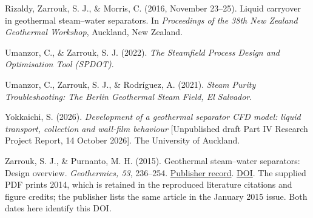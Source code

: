 Rizaldy, Zarrouk, S. J., \& Morris, C. (2016, November 23--25). Liquid carryover in geothermal steam--water separators. In \emph{Proceedings of the 38th New Zealand Geothermal Workshop}, Auckland, New Zealand.

Umanzor, C., \& Zarrouk, S. J. (2022). \emph{The Steamfield Process Design and Optimisation Tool (SPDOT)}.

Umanzor, C., Zarrouk, S. J., \& Rodríguez, A. (2021). \emph{Steam Purity Troubleshooting: The Berlin Geothermal Steam Field, El Salvador}.

Yokkaichi, S. (2026). \emph{Development of a geothermal separator CFD model: liquid transport, collection and wall-film behaviour} {[}Unpublished draft Part IV Research Project Report, 14 October 2026{]}. The University of Auckland.

Zarrouk, S. J., \& Purnanto, M. H. (2015). Geothermal steam--water separators: Design overview. \emph{Geothermics, 53}, 236--254. \href{https://www.sciencedirect.com/science/article/abs/pii/S0375650514000637}{Publisher record}. \href{https://doi.org/10.1016/j.geothermics.2014.05.009}{DOI}. The supplied PDF prints 2014, which is retained in the reproduced literature citations and figure credits; the publisher lists the same article in the January 2015 issue. Both dates here identify this DOI.
